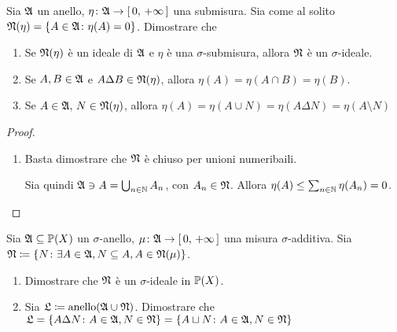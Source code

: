 \documentclass[../EserciziIstituzioniAnalisi.tex]{subfiles}
\begin{document}
\begin{exercise}[2016-10-20]
  Sia $\mathfrak A$ un anello, $\eta\colon\mathfrak A\to\left[\,0,\,+\infty\,\right]$ una submisura. Sia come al solito $\mathfrak N(\eta)=\left\{A\in\mathfrak A\colon\eta(A)=0\right\}$. Dimostrare che
  \begin{enumerate}
    \item Se $\mathfrak N(\eta)$ è un ideale di $\mathfrak A$ e $\eta$ è una $\sigma$-submisura, allora $\mathfrak N$ è un $\sigma$-ideale.
    \item Se $A,B\in \mathfrak A$ e $A\Delta B\in \mathfrak N(\eta)$, allora $\eta(A)=\eta(A\cap B)=\eta(B)$.
    \item Se $A\in \mathfrak A,\, N\in \mathfrak N(\eta)$, allora $\eta(A)=\eta(A\cup N)=\eta(A\Delta N)=\eta(A\setminus N)$
  \end{enumerate}
\end{exercise}
\begin{proof}
  \begin{enumerate}
    \item Basta dimostrare che $\mathfrak N$ è chiuso per unioni numeribaili.

    Sia quindi $\mathfrak A\ni A=\bigcup_{n\in\mathbb N}A_n$, con $A_n\in\mathfrak N$. Allora $\eta(A)\leq\sum_{n\in\mathbb N}\eta(A_n)=0$.
  \end{enumerate}
\end{proof}
\begin{exercise}[2016-10-20]
  Sia $\mathfrak A\subseteq\mathbb P(X)$ un $\sigma$-anello, $\mu\colon \mathfrak A\to\left[\,0,\,+\infty\,\right]$ una misura $\sigma$-additiva.
  Sia $\mathfrak N\coloneqq\left\{N\colon\exists A\in \mathfrak A, N\subseteq A, A\in \mathfrak N(\mu)\right\}$.

  \begin{enumerate}
    \item Dimostrare che $\mathfrak N$ è un $\sigma$-ideale in $\mathbb P(X)$.
    \item Sia $\mathfrak L\coloneqq\operatorname{anello}(\mathfrak A\cup\mathfrak N)$. Dimostrare che $\mathfrak L=\left\{A\Delta N\colon A\in\mathfrak A,N\in\mathfrak N\right\}=\left\{A\sqcup N\colon A\in\mathfrak A,N\in\mathfrak N\right\}$ 
  \end{enumerate}
\end{exercise}
\end{document}
